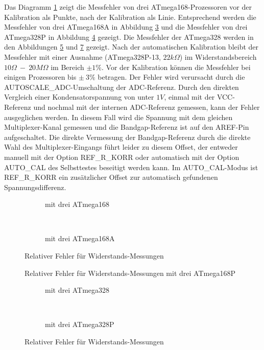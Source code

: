 Das Diagramm \ref{fig:m168res_all} zeigt die Messfehler von drei ATmega168-Prozessoren vor der Kalibration als Punkte, nach der
Kalibration als Linie. Entsprechend werden die Messfehler von drei ATmega168A in Abbildung \ref{fig:m168ares_all} und
die Messfehler von drei ATmega328P in Abbildung \ref{fig:m168pres_all} gezeigt.
Die Messfehler der ATmega328 werden in den Abbildungen \ref{fig:m328res_all} und \ref{fig:m328pres_all} gezeigt.
Nach der automatischen Kalibration bleibt der Messfehler mit einer Ausnahme (ATmega328P-13, \(22k\Omega\)) im Widerstandsbereich
\(10\Omega~-~20M\Omega\) im Bereich \(\pm1\%\).
Vor der Kalibration können die Messfehler bei einigen Prozessoren bis \(\pm~3\%\) betragen.
Der Fehler wird verursacht durch die AUTOSCALE\_ADC-Umschaltung der ADC-Referenz.
Durch den direkten Vergleich einer Kondensatorspannung von unter \(1V\), einmal mit der VCC-Referenz und nochmal mit
der internen ADC-Referenz gemessen, kann der Fehler ausgeglichen werden.
In diesem Fall wird die Spannung mit dem gleichen Multiplexer-Kanal gemessen und die Bandgap-Referenz ist auf den AREF-Pin
aufgeschaltet.
Die direkte Vermessung der Bandgap-Referenz durch die direkte Wahl des Multiplexer-Eingangs führt leider zu diesem Offset,
der entweder manuell mit der Option REF\_R\_KORR oder automatisch mit der Option AUTO\_CAL des Selbsttestes beseitigt werden kann.
Im AUTO\_CAL-Modus ist REF\_R\_KORR ein zusätzlicher Offset zur automatisch gefundenen Spannungsdifferenz.

\begin{figure}[H]
  \begin{subfigure}[b]{9cm}
    \centering
    \resizebox{9cm}{!}{}
    \caption{mit drei ATmega168}
    \label{fig:m168res_all}
  \end{subfigure}
  ~
  \begin{subfigure}[b]{9cm}
    \centering
    \resizebox{9cm}{!}{}
    \caption{mit drei ATmega168A}
    \label{fig:m168ares_all}
  \end{subfigure}
\caption{Relativer Fehler für Widerstands-Messungen}
\end{figure}

\begin{figure}[H]
\centering

\caption{Relativer Fehler für Widerstands-Messungen mit drei ATmega168P }
\label{fig:m168pres_all}
\end{figure}

\begin{figure}[H]
  \begin{subfigure}[b]{9cm}
    \centering
    \resizebox{9cm}{!}{}
    \caption{mit drei ATmega328}
    \label{fig:m328res_all}
  \end{subfigure}
  ~
  \begin{subfigure}[b]{9cm}
    \centering
    \resizebox{9cm}{!}{}
    \caption{mit drei ATmega328P}
    \label{fig:m328pres_all}
  \end{subfigure}
\caption{Relativer Fehler für Widerstands-Messungen}
\end{figure}

